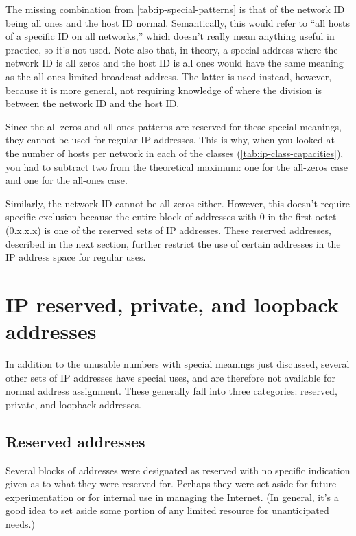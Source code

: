 \begin{note}
The missing combination from \cref{tab:ip-special-patterns} is that of the network ID being all ones and the host ID normal.
Semantically, this would refer to ``all hosts of a specific ID on all networks,'' which doesn't really mean anything useful in practice, so it's not used.
Note also that, in theory, a special address where the network ID is all zeros and the host ID is all ones would have the same meaning as the all-ones limited broadcast address.
The latter is used instead, however, because it is more general, not requiring knowledge of where the division is between the network ID and the host ID.
\end{note}

Since the all-zeros and all-ones patterns are reserved for these special meanings, they cannot be used for regular IP addresses.
This is why, when you looked at the number of hosts per network in each of the classes (\vref{tab:ip-class-capacities}), you had to subtract two from the
theoretical maximum: one for the all-zeros case and one for the all-ones case.

Similarly, the network ID cannot be all zeros either.
However, this doesn't require specific exclusion because the entire block of addresses with 0 in the first octet (0.x.x.x) is one of the reserved sets of IP addresses.
These reserved addresses, described in the next section, further restrict the use of certain addresses in the IP address space for regular uses.



\section{IP reserved, private, and loopback addresses}
\label{sec:ip-reserved-addresses}

In addition to the unusable numbers with special meanings just
discussed, several other sets of IP addresses have special uses, and are
therefore not available for normal address assignment.
These generally fall into three categories: reserved, private, and loopback addresses.

\subsection{Reserved addresses}

Several blocks of addresses were designated as reserved with no specific
indication given as to what they were reserved for. Perhaps they were
set aside for future experimentation or for internal use in managing the
Internet.
(In general, it's a good idea to set aside some portion of any limited resource for unanticipated needs.)

